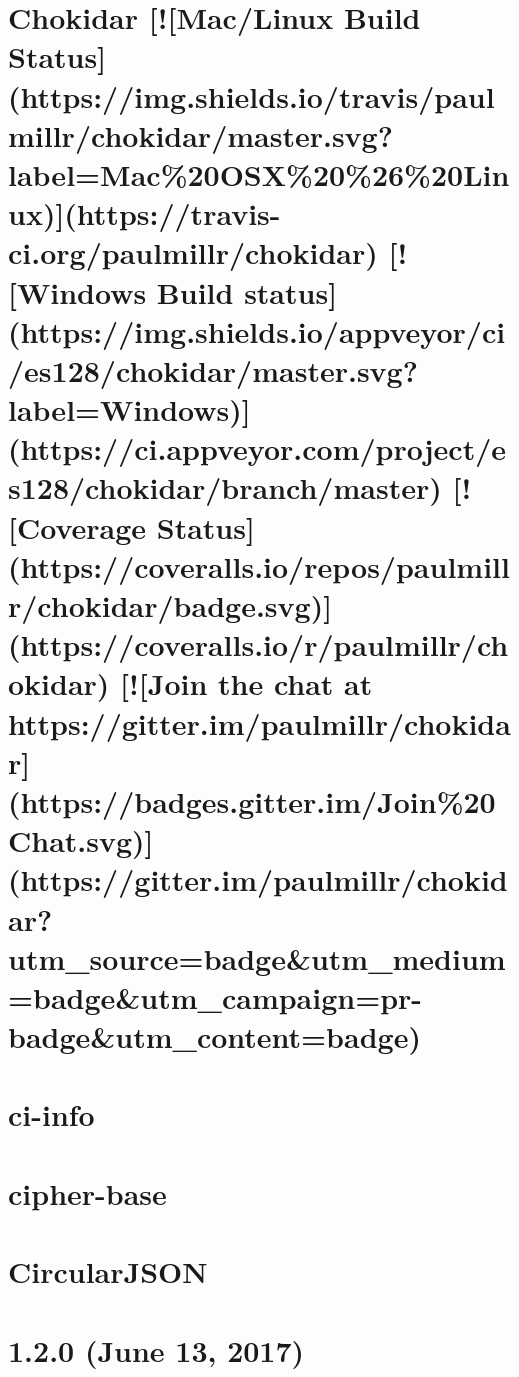 \documentclass[twoside]{book}
\newcommand{\+}{\discretionary{\mbox{\scriptsize$\hookleftarrow$}}{}{}}
\begin{document}
\chapter{Chokidar \mbox{[}!\mbox{[}Mac/\+Linux Build Status\mbox{]}(https\+://img.shields.\+io/travis/paulmillr/chokidar/master.svg?label=Mac\%20\+O\+SX\%20\%26\%20\+Linux)\mbox{]}(https\+://travis-\/ci.org/paulmillr/chokidar) \mbox{[}!\mbox{[}Windows Build status\mbox{]}(https\+://img.shields.\+io/appveyor/ci/es128/chokidar/master.svg?label=Windows)\mbox{]}(https\+://ci.appveyor.\+com/project/es128/chokidar/branch/master) \mbox{[}!\mbox{[}Coverage Status\mbox{]}(https\+://coveralls.io/repos/paulmillr/chokidar/badge.svg)\mbox{]}(https\+://coveralls.io/r/paulmillr/chokidar) \mbox{[}!\mbox{[}Join the chat at https\+://gitter.im/paulmillr/chokidar\mbox{]}(https\+://badges.gitter.\+im/\+Join\%20\+Chat.svg)\mbox{]}(https\+://gitter.im/paulmillr/chokidar?utm\+\_\+source=badge\&utm\+\_\+medium=badge\&utm\+\_\+campaign=pr-\/badge\&utm\+\_\+content=badge)}
\label{md__c_1_workspace_demo_src_main_script_node_modules_chokidar__r_e_a_d_m_e}

\chapter{ci-\/info}
\label{md__c_1_workspace_demo_src_main_script_node_modules_ci-info__r_e_a_d_m_e}

\chapter{cipher-\/base}
\label{md__c_1_workspace_demo_src_main_script_node_modules_cipher-base_readme}

\chapter{Circular\+J\+S\+ON}
\label{md__c_1_workspace_demo_src_main_script_node_modules_circular-json__r_e_a_d_m_e}

\chapter{1.2.0 (June 13, 2017)}
\label{md__c_1_workspace_demo_src_main_script_node_modules_clap__h_i_s_t_o_r_y}

\end{document}
